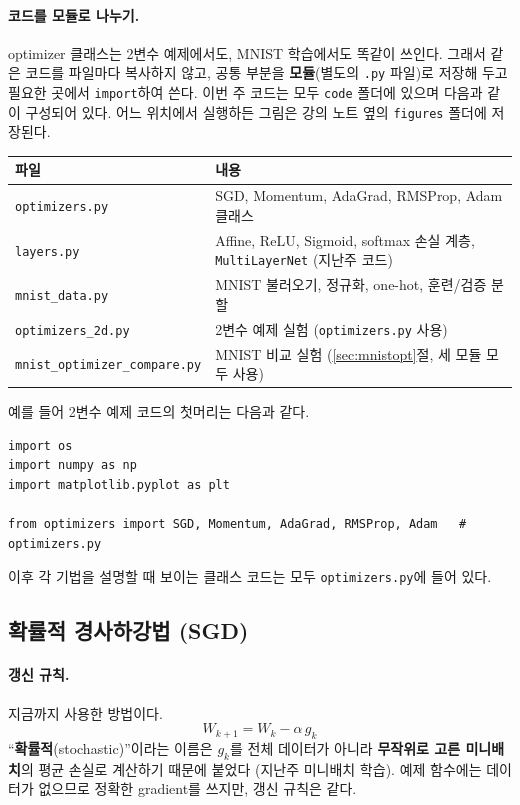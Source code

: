\documentclass[11pt,a4paper]{article}
\begin{document}
\paragraph{코드를 모듈로 나누기.}
optimizer 클래스는 2변수 예제에서도, MNIST 학습에서도 똑같이 쓰인다.
그래서 같은 코드를 파일마다 복사하지 않고, 공통 부분을 \textbf{모듈}(별도의 \texttt{.py} 파일)로 저장해 두고
필요한 곳에서 \texttt{import}하여 쓴다.
이번 주 코드는 모두 \texttt{code} 폴더에 있으며 다음과 같이 구성되어 있다.
어느 위치에서 실행하든 그림은 강의 노트 옆의 \texttt{figures} 폴더에 저장된다.

\begin{center}
\begin{tabular}{@{}lp{}@{}}
\toprule
파일 & 내용 \\
\midrule
\texttt{optimizers.py} & SGD, Momentum, AdaGrad, RMSProp, Adam 클래스 \\
\texttt{layers.py} & Affine, ReLU, Sigmoid, softmax 손실 계층, \texttt{MultiLayerNet} (지난주 코드) \\
\texttt{mnist\_data.py} & MNIST 불러오기, 정규화, one-hot, 훈련/검증 분할 \\
\midrule
\texttt{optimizers\_2d.py} & 2변수 예제 실험 (\texttt{optimizers.py} 사용) \\
\texttt{mnist\_optimizer\_compare.py} & MNIST 비교 실험 (\ref{sec:mnistopt}절, 세 모듈 모두 사용) \\
\bottomrule
\end{tabular}
\end{center}

예를 들어 2변수 예제 코드의 첫머리는 다음과 같다.
\begin{lstlisting}
import os
import numpy as np
import matplotlib.pyplot as plt

from optimizers import SGD, Momentum, AdaGrad, RMSProp, Adam   # optimizers.py
\end{lstlisting}
이후 각 기법을 설명할 때 보이는 클래스 코드는 모두 \texttt{optimizers.py}에 들어 있다.

\subsection{확률적 경사하강법 (SGD)}\label{sec:sgd}

\paragraph{갱신 규칙.}
지금까지 사용한 방법이다.
\[
\boxed{
W_{k+1}=W_k-\alpha\,g_k
}
\]
``\textbf{확률적}(stochastic)''이라는 이름은 $g_k$를 전체 데이터가 아니라
\textbf{무작위로 고른 미니배치}의 평균 손실로 계산하기 때문에 붙었다 (지난주 미니배치 학습).
예제 함수에는 데이터가 없으므로 정확한 gradient를 쓰지만, 갱신 규칙은 같다.
\end{document}

